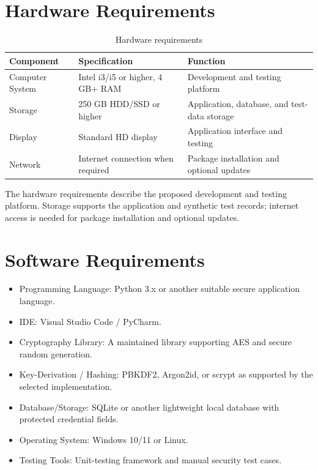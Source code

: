 \documentclass[12pt,a4paper,oneside]{report}
\begin{document}
\section{Hardware Requirements}
\begin{table}[H]
\centering
\caption{Hardware requirements}
\label{tab:hardware}
\small
\begin{tabularx}{\linewidth}{@{}p{.21\linewidth}p{.35\linewidth}X@{}}
\toprule
\textbf{Component} & \textbf{Specification} & \textbf{Function} \\
\midrule
Computer System & Intel i3/i5 or higher, 4 GB+ RAM & Development and testing platform \\
Storage & 250 GB HDD/SSD or higher & Application, database, and test-data storage \\
Display & Standard HD display & Application interface and testing \\
Network & Internet connection when required & Package installation and optional updates \\
\bottomrule
\end{tabularx}
\end{table}
The hardware requirements describe the proposed development and testing platform. Storage supports the application and synthetic test records; internet access is needed for package installation and optional updates.
\section{Software Requirements}

\begin{itemize}
\item Programming Language: Python 3.x or another suitable secure application language.
\item IDE: Visual Studio Code / PyCharm.
\item Cryptography Library: A maintained library supporting AES and secure random generation.
\item Key-Derivation / Hashing: PBKDF2, Argon2id, or scrypt as supported by the selected implementation.
\item Database/Storage: SQLite or another lightweight local database with protected credential fields.
\item Operating System: Windows 10/11 or Linux.
\item Testing Tools: Unit-testing framework and manual security test cases.
\end{itemize}
\end{document}
